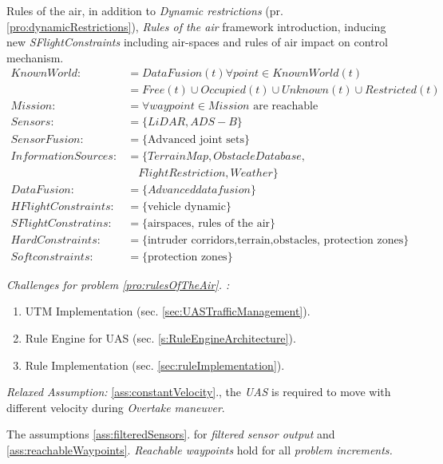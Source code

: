 \begin{problem}{Rules of the air}\label{pro:rulesOfTheAir}, 
    in addition to \emph{Dynamic restrictions} (pr. \ref{pro:dynamicRestrictions}), \emph{Rules of the air} framework introduction, inducing new \emph{SFlightConstraints} including air-spaces and rules of air impact on control mechanism.
    \begin{equation}\label{eq:rulesOfTheAir}
        \begin{aligned}
            KnownWorld:&= DataFusion(t)\forall point\in KnownWorld(t)\\
                       &=Free(t) \cup Occupied(t) \cup Unknown(t) \cup Restricted(t)\\
            Mission:&= \forall waypoint\in Mission \text{ are reachable}\\
            Sensors:&= \{LiDAR,ADS-B\}\\
            SensorFusion:&= \{\text{Advanced joint sets}\}\\
            InformationSources:&=\{Terrain Map,Obstacle Database,\\
                               &\quad Flight Restriction,Weather\}\\
            DataFusion:&= \{Advanced data fusion\}\\
            HFlightConstraints:&=\{\text{vehicle dynamic}\}\\
            SFlightConstratins:&=\{\text{airspaces, rules of the air}\}\\
            HardConstraints:&=\{\text{intruder corridors,terrain,obstacles, protection zones}\}\\
            Softconstraints:&=\{\text{protection zones}\}
        \end{aligned}
    \end{equation}
    
    \noindent \emph{Challenges for problem  \ref{pro:rulesOfTheAir}. :}
    \begin{enumerate}
        \item UTM Implementation (sec. \ref{sec:UASTrafficManagement}).
        \item Rule Engine for UAS (sec. \ref{s:RuleEngineArchitecture}).
        \item Rule Implementation (sec. \ref{sec:ruleImplementation}).
    \end{enumerate}
    
    \noindent \emph{Relaxed Assumption: } \ref{ass:constantVelocity}., the \emph{UAS} is required to move with different velocity during \emph{Overtake maneuver}.
\end{problem}

\begin{note}
    The assumptions \ref{ass:filteredSensors}. for \emph{filtered sensor output} and \ref{ass:reachableWaypoints}. \emph{Reachable waypoints} hold for all \emph{problem increments.}
\end{note}